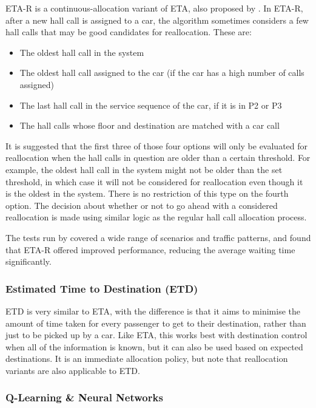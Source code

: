 \documentclass{UoYCSproject}
\begin{document}
ETA-R is a continuous-allocation variant of ETA, also proposed by \citet{Rong2003}.  In ETA-R, after a new hall call is assigned to a car, the algorithm sometimes considers a few hall calls that may be good candidates for reallocation.  These are:
\begin{itemize}
	\item The oldest hall call in the system
	\item The oldest hall call assigned to the car (if the car has a high number of calls assigned)
	\item The last hall call in the service sequence of the car, if it is in P2 or P3
	\item The hall calls whose floor and destination are matched with a car call
\end{itemize}

It is suggested that the first three of those four options will only be evaluated for reallocation when the hall calls in question are older than a certain threshold.  For example, the oldest hall call in the system might not be older than the set threshold, in which case it will not be considered for reallocation even though it is the oldest in the system.  There is no restriction of this type on the fourth option.  The decision about whether or not to go ahead with a considered reallocation is made using similar logic as the regular hall call allocation process.

The tests run by \citet{Rong2003} covered a wide range of scenarios and traffic patterns, and found that ETA-R offered improved performance, reducing the average waiting time significantly.

\subsubsection{Estimated Time to Destination (ETD) \citep{Smith2002}}

ETD is very similar to ETA, with the difference is that it aims to minimise the amount of time taken for every passenger to get to their destination, rather than just to be picked up by a car.  Like ETA, this works best with destination control when all of the information is known, but it can also be used based on expected destinations.  It is an immediate allocation policy, but \citet{Smith2002} note that reallocation variants are also applicable to ETD.

\subsubsection{Q-Learning \& Neural Networks \citep{Crites1998}}
\end{document}
